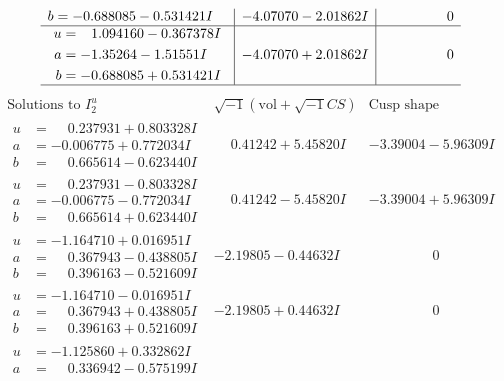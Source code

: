 \documentclass[1p]{elsarticle_modified}
\theoremstyle{definition}
\newcommand{\I}{\sqrt{-1}}
\begin{document}
$$\begin{array}{c|c|c}
\begin{aligned}
b &= -0.688085 - 0.531421 I\end{aligned}
 & -4.07070 - 2.01862 I & \phantom{-0.000000 } 0 \\ \hline\begin{aligned}
u &= \phantom{-}1.094160 - 0.367378 I \\
a &= -1.35264 - 1.51551 I \\
b &= -0.688085 + 0.531421 I\end{aligned}
 & -4.07070 + 2.01862 I & \phantom{-0.000000 } 0\\
 \hline 
 \end{array}$$\newpage$$\begin{array}{c|c|c}  
\text{Solutions to }I^u_{2}& \I (\text{vol} + \sqrt{-1}CS) & \text{Cusp shape}\\
 \hline 
\begin{aligned}
u &= \phantom{-}0.237931 + 0.803328 I \\
a &= -0.006775 + 0.772034 I \\
b &= \phantom{-}0.665614 - 0.623440 I\end{aligned}
 & \phantom{-}0.41242 + 5.45820 I & -3.39004 - 5.96309 I \\ \hline\begin{aligned}
u &= \phantom{-}0.237931 - 0.803328 I \\
a &= -0.006775 - 0.772034 I \\
b &= \phantom{-}0.665614 + 0.623440 I\end{aligned}
 & \phantom{-}0.41242 - 5.45820 I & -3.39004 + 5.96309 I \\ \hline\begin{aligned}
u &= -1.164710 + 0.016951 I \\
a &= \phantom{-}0.367943 - 0.438805 I \\
b &= \phantom{-}0.396163 - 0.521609 I\end{aligned}
 & -2.19805 - 0.44632 I & \phantom{-0.000000 } 0 \\ \hline\begin{aligned}
u &= -1.164710 - 0.016951 I \\
a &= \phantom{-}0.367943 + 0.438805 I \\
b &= \phantom{-}0.396163 + 0.521609 I\end{aligned}
 & -2.19805 + 0.44632 I & \phantom{-0.000000 } 0 \\ \hline\begin{aligned}
u &= -1.125860 + 0.332862 I \\
a &= \phantom{-}0.336942 - 0.575199 I \\

\end{aligned}
\end{array}$$
\end{document}
